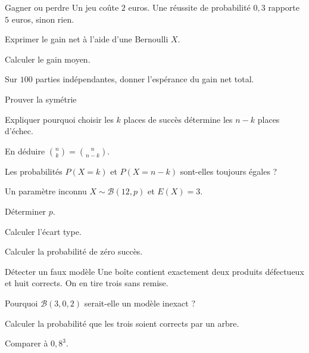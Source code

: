 \begingroup\renewcommand{\otBesoinPlace}[1]{}\begin{minipage}{\linewidth}
\begin{exercice}[3]{Gagner ou perdre}
Un jeu coûte $2$ euros. Une réussite de probabilité $0{,}3$ rapporte $5$ euros, sinon rien.
\begin{questions}
\item Exprimer le gain net à l’aide d’une Bernoulli $X$.
\item Calculer le gain moyen.
\item Sur $100$ parties indépendantes, donner l’espérance du gain net total.
\end{questions}
\end{exercice}
\begin{exercice}[3]{Prouver la symétrie}

\begin{questions}
\item Expliquer pourquoi choisir les $k$ places de succès détermine les $n-k$ places d’échec.
\item En déduire $\binom nk=\binom n{n-k}$.
\item Les probabilités $P(X=k)$ et $P(X=n-k)$ sont-elles toujours égales ?
\end{questions}
\end{exercice}
\begin{exercice}[3]{Un paramètre inconnu}
$X\sim\mathcal B(12,p)$ et $E(X)=3$.
\begin{questions}
\item Déterminer $p$.
\item Calculer l’écart type.
\item Calculer la probabilité de zéro succès.
\end{questions}
\end{exercice}
\begin{exercice}[3]{Détecter un faux modèle}
Une boîte contient exactement deux produits défectueux et huit corrects. On en tire trois sans remise.
\begin{questions}
\item Pourquoi $\mathcal B(3,0{,}2)$ serait-elle un modèle inexact ?
\item Calculer la probabilité que les trois soient corrects par un arbre.
\item Comparer à $0{,}8^3$.
\end{questions}
\end{exercice}
\end{minipage}\endgroup
